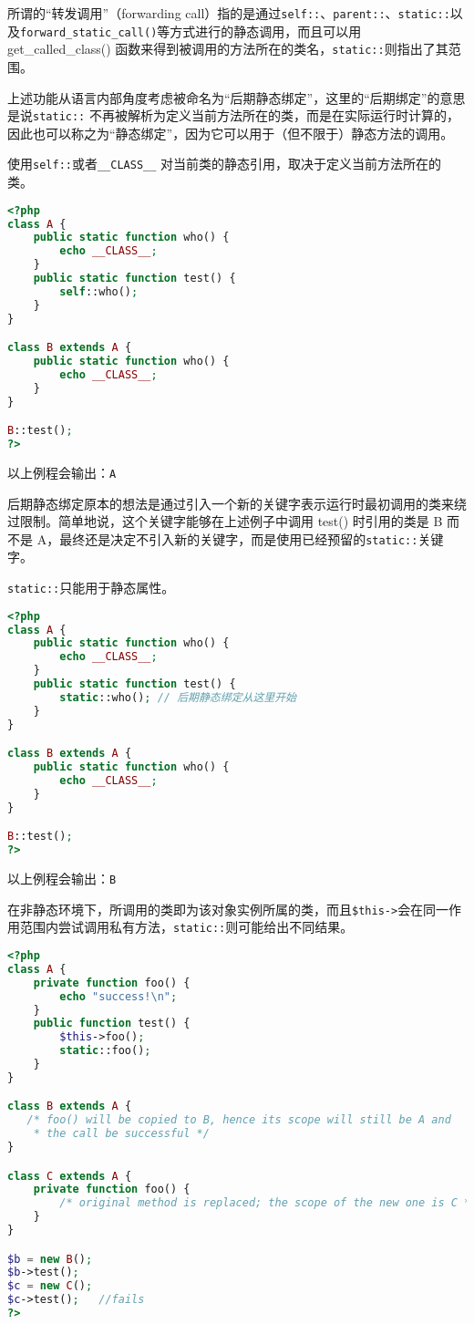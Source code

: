 所谓的“转发调用”（forwarding call）指的是通过\texttt{self::}、\texttt{parent::}、\texttt{static::}以及\texttt{forward\_static\_call()}等方式进行的静态调用，而且可以用 get\_called\_class() 函数来得到被调用的方法所在的类名，\texttt{static::}则指出了其范围。

上述功能从语言内部角度考虑被命名为“后期静态绑定”，这里的“后期绑定”的意思是说\texttt{static::} 不再被解析为定义当前方法所在的类，而是在实际运行时计算的，因此也可以称之为“静态绑定”，因为它可以用于（但不限于）静态方法的调用。

使用\texttt{self::}或者\texttt{\_\_CLASS\_\_} 对当前类的静态引用，取决于定义当前方法所在的类。


\begin{lstlisting}[language=PHP]
<?php
class A {
    public static function who() {
        echo __CLASS__;
    }
    public static function test() {
        self::who();
    }
}

class B extends A {
    public static function who() {
        echo __CLASS__;
    }
}

B::test();
?>
\end{lstlisting}

以上例程会输出：\verb|A|



后期静态绑定原本的想法是通过引入一个新的关键字表示运行时最初调用的类来绕过限制。简单地说，这个关键字能够在上述例子中调用 test() 时引用的类是 B 而不是 A，最终还是决定不引入新的关键字，而是使用已经预留的\texttt{static::}关键字。

\texttt{static::}只能用于静态属性。

\begin{lstlisting}[language=PHP]
<?php
class A {
    public static function who() {
        echo __CLASS__;
    }
    public static function test() {
        static::who(); // 后期静态绑定从这里开始
    }
}

class B extends A {
    public static function who() {
        echo __CLASS__;
    }
}

B::test();
?>
\end{lstlisting}


以上例程会输出：\verb|B|

在非静态环境下，所调用的类即为该对象实例所属的类，而且\texttt{\$this->}会在同一作用范围内尝试调用私有方法，\texttt{static::}则可能给出不同结果。



\begin{lstlisting}[language=PHP]
<?php
class A {
    private function foo() {
        echo "success!\n";
    }
    public function test() {
        $this->foo();
        static::foo();
    }
}

class B extends A {
   /* foo() will be copied to B, hence its scope will still be A and
    * the call be successful */
}

class C extends A {
    private function foo() {
        /* original method is replaced; the scope of the new one is C */
    }
}

$b = new B();
$b->test();
$c = new C();
$c->test();   //fails
?>
\end{lstlisting}

